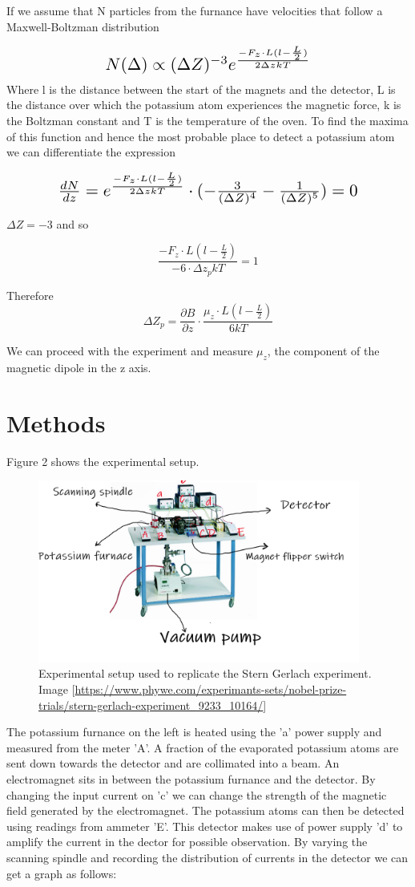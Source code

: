 \documentclass{article}%
\begin{document}
If we assume that N particles from the furnance have velocities that follow a Maxwell-Boltzman distribution 


\[ \scalebox{1.5}{$N(\Delta) \propto (\Delta Z)^{-3} e^{\frac{-F_z \cdot L(l- \frac{L}{2})}{2 \Delta z kT}}$} \]
Where l is the distance between the start of the magnets and the detector, L is the distance over which the potassium atom experiences the magnetic force, k is the Boltzman constant and T is the temperature of the oven.
To find the maxima of this function and hence the most probable place to detect a potassium atom we can differentiate the expression


\[ \scalebox{1.5}{$\frac{dN}{dz} =  e^{\frac{-F_z \cdot L(l- \frac{L}{2})}{2 \Delta z kT}} \cdot (-\frac{3}{(\Delta Z)^4} - \frac{1}{(\Delta Z)^5}) = 0 $} \]

$\Delta Z = -3$ and so  

$$
\frac{-F_z \cdot L(l- \frac{L}{2})}{-6 \cdot \Delta z_p kT} = 1 
$$

Therefore 
\begin{equation}
    \Delta Z_p = \frac{\partial B}{\partial z} \cdot \frac{\mu_z \cdot  L(l - \frac{L}{2})}{6kT}
\end{equation}

We can proceed with the experiment and measure $\mu_z$, the component of the magnetic dipole in the z axis.

\section{Methods}
Figure 2 shows the experimental setup. 
\begin{figure}[H]%
    \centering%
    \includegraphics[width=400px]{experimental_setup_labeled.png}%
    \caption{Experimental setup used to replicate the Stern Gerlach experiment. Image [\url{https://www.phywe.com/experimants-sets/nobel-prize-trials/stern-gerlach-experiment_9233_10164/}]}%
\end{figure}
The potassium furnance on the left is heated using the 'a' power supply and measured from the meter 'A'. A fraction of the evaporated potassium atoms are sent down towards the detector and are collimated into a beam.
An electromagnet sits in between the potassium furnance and the detector. By changing the input current on 'c' we can change the strength of the magnetic field generated by the electromagnet. The potassium atoms can then be detected using readings from ammeter 'E'.
This detector makes use of power supply 'd' to amplify the current in the dector for possible observation.
By varying the scanning spindle and recording the distribution of currents in the detector we can get a graph as follows:
\end{document}
